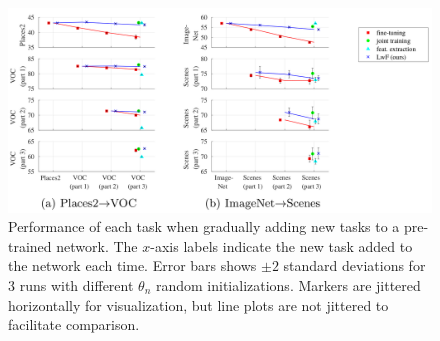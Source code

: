 \documentclass[a4paper,twocolumn]{article}
\begin{document}
\begin{figure}[t]
    \centering
    \includegraphics[width=\textwidth]{gradual.png}
    \caption{Performance of each task when gradually adding new tasks to a pre-trained network. The $x$-axis labels indicate the new task added to the network each time. Error bars shows $\pm2$ standard deviations for 3 runs with different $\theta_n$ random initializations. Markers are jittered horizontally for visualization, but line plots are not jittered to facilitate comparison.}
    \label{fig:table}
\end{figure}
\end{document}
